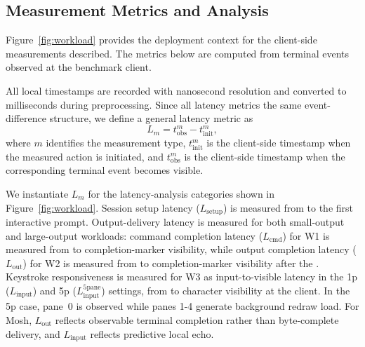 \subsection{Measurement Metrics and Analysis}
\label{subsec:measurement-analysis}

Figure~\ref{fig:workload} provides the deployment context for the client-side measurements described. The metrics below are computed from terminal events observed at the benchmark client.

All local timestamps are recorded with nanosecond resolution and converted to milliseconds during preprocessing. Since all latency metrics  the same event-difference structure, we define a general latency metric as
\begin{equation}
L_m = t_{\mathrm{obs}}^{m} - t_{\mathrm{init}}^{m},
\end{equation}
where $m$ identifies the measurement type, $t_{\mathrm{init}}^{m}$ is the client-side timestamp when the measured action is initiated, and $t_{\mathrm{obs}}^{m}$ is the client-side timestamp when the corresponding terminal event becomes visible.

We instantiate $L_m$ for the latency-analysis categories shown in Figure~\ref{fig:workload}. Session setup latency ($L_{\mathrm{setup}}$) is measured from  to the first interactive prompt. Output-delivery latency is measured for both small-output and large-output workloads: command completion latency ($L_{\mathrm{cmd}}$) for W1 is measured from  to completion-marker visibility, while output completion latency ($L_{\mathrm{out}}$) for W2 is measured from  to completion-marker visibility after the . Keystroke responsiveness is measured for W3 as input-to-visible latency in the 1p ($L_{\mathrm{input}}$) and 5p ($L_{\mathrm{input}}^{\mathrm{5pane}}$) settings, from  to character visibility at the client. In the 5p case, pane~0 is observed while panes 1-4 generate background redraw load. For Mosh, $L_{\mathrm{out}}$ reflects observable terminal completion rather than byte-complete delivery, and $L_{\mathrm{input}}$ reflects predictive local echo.


